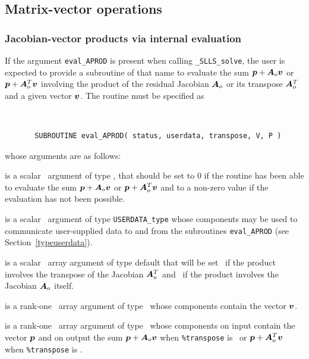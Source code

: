 \documentclass{galahad}
\newcommand{\packagename}{SLLS}
\newcommand{\fullpackagename}{\libraryname\_\packagename}
\newcommand{\solver}{{\tt \fullpackagename\_solve}}
\begin{document}

\subsection{Matrix-vector operations\label{fdv}}


\subsubsection{Jacobian-vector products via internal evaluation\label{jvp}}

If the argument {\tt eval\_APROD} is present when calling \solver, the
user is expected to provide a subroutine of that name to evaluate the
sum ${\bm{p}} + {\bm{A}}_o {\bm{v}}$ or ${\bm{p}} + {\bm{A}}_o^T{\bm{v}}$ involving the
product of the residual Jacobian ${\bm{A}}_o$ or its transpose ${\bm{A}}_o^T$
and a given vector ${\bm{v}}$.
The routine must be specified as

\def\baselinestretch{0.8}
{\tt
\begin{verbatim}
       SUBROUTINE eval_APROD( status, userdata, transpose, V, P )
\end{verbatim} }
\def\baselinestretch{1.0}
\noindent whose arguments are as follows:

\begin{description}
 is a scalar \intentout\ argument of type \integer,
that should be set to 0 if the routine has been able to evaluate the
sum ${\bm{p}} + {\bm{A}}_o {\bm{v}}$ or ${\bm{p}} + {\bm{A}}_o^T{\bm{v}}$
and to a non-zero value if the evaluation has not been possible.

 is a scalar \intentinout\ argument of type
{\tt USERDATA\_type} whose components may be used
to communicate user-supplied data to and from the subroutines
{\tt eval\_APROD}
(see Section~\ref{typeuserdata}).

 is a scalar \intentin\ array argument of type
default that will be set \true\ if the product involves the transpose
of the Jacobian ${\bm{A}}_o^T$ and \false\ if the product involves
the Jacobian ${\bm{A}}_o$ itself.

 is a rank-one \intentin\ array argument of type \realdp\
whose components contain the vector ${\bm{v}}$.

 is a rank-one \intentinout\ array argument of type \realdp\
whose components on input contain the vector ${\bm{p}}$ and on output the
sum ${\bm{p}} + {\bm{A}}_o {\bm{v}}$ when {\tt \%transpose} is \false\ or
${\bm{p}} + {\bm{A}}_o^T {\bm{v}}$ when {\tt \%transpose} is \true.

\end{description}
\end{document}
